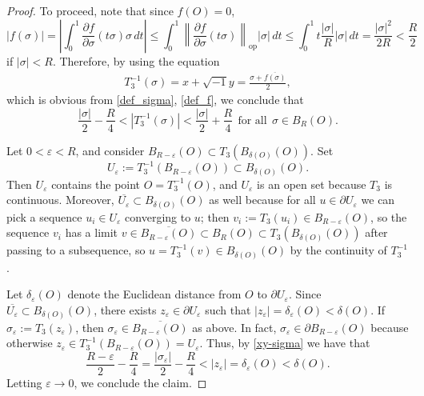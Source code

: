 \documentclass[11pt,reqno]{amsart}
\renewcommand{\leq}{\leqslant}
\theoremstyle{plain}
\theoremstyle{definition}
\numberwithin{equation}{section}
\begin{document}
\begin{proof}
\noindent To proceed, note that since $f(O)=0$,
$$
  |f(\sigma)| = \displaystyle \left|\int_{0}^{1} \frac{\partial f}{\partial \sigma}(t\sigma)\sigma \, dt\right|  
           \leq  \displaystyle \int_{0}^{1} \left\|\frac{\partial f}{\partial \sigma}(t\sigma)\right\|_{\operatorname{op}}|\sigma| \, dt 
           \leq  \displaystyle  \int_{0}^{1} t\frac{|\sigma|}{R}|\sigma| \, dt 
           =  \displaystyle  \frac{|\sigma|^2}{2R} 
           <   \displaystyle \frac{R}{2}
$$
if $|\sigma|<R$. Therefore, by using the equation
\begin{align*}
    T_3^{-1}(\sigma) = x+\sqrt{-1}y=\frac{\sigma+\overline{f(\sigma)}}{2},
\end{align*}
which is obvious from \eqref{def_sigma}, \eqref{def_f}, we conclude that
\begin{equation}\label{xy-sigma}
\frac{|\sigma|}{2}-\frac{R}{4} < |T_3^{-1}(\sigma)| < \frac{|\sigma|}{2}+\frac{R}{4} \;\,\text{for all}\;\,\sigma \in B_R(O).
\end{equation}

\noindent {\bf Proof of the inequality $R/4\leq\delta(O)$:} Let $0<\varepsilon<R$, and consider $B_{R-\varepsilon}(O)\subset T_{3}(B_{\delta(O)}(O))$. Set $$U_{\varepsilon}:=T_{3}^{-1}(B_{R-\varepsilon}(O))\subset B_{\delta(O)}(O).$$
Then $U_\varepsilon$ contains the point $O = T_3^{-1}(O)$, and $U_\varepsilon$ is an open set because $T_3$ is continuous. Moreover, $\overline{U_{\varepsilon}}\subset B_{\delta(O)}(O)$ as well because for all $u \in \partial U_\varepsilon$ we can pick a sequence $u_i \in U_\varepsilon$ converging to $u$; then $v_i := T_3(u_i) \in B_{R-\varepsilon}(O)$, so the sequence $v_i$ has a limit $v \in \overline{B_{R-\varepsilon}(O)} \subset B_R(O) \subset T_3(B_{\delta(O)}(O))$ after passing to a subsequence, so $u = T_3^{-1}(v) \in B_{\delta(O)}(O)$ by the continuity of $T_3^{-1}$.

Let $\delta_{\varepsilon}(O)$ denote the Euclidean distance from $O$ to $\partial U_{\varepsilon}$. Since $\overline{U_\varepsilon}\subset B_{\delta(O)}(O)$, there exists $z_\varepsilon\in\partial U_\varepsilon $ such that $|z_{\varepsilon}|=\delta_{\varepsilon}(O) < \delta(O)$. If  $\sigma_{\varepsilon}:=T_{3}(z_{\varepsilon})$, then $\sigma_\varepsilon\in \overline{B_{R-\varepsilon}(O)}$ as above. In fact, $\sigma_\varepsilon \in \partial B_{R-\varepsilon}(O)$ because otherwise $z_\varepsilon \in T_3^{-1}(B_{R-\varepsilon}(O)) = U_\varepsilon$. Thus, by \eqref{xy-sigma} we have that
$$\frac{R-\varepsilon}{2} - \frac{R}{4} = \frac{|\sigma_{\varepsilon}|}{2}-\frac{R}{4} < |z_{\varepsilon}| = \delta_\varepsilon(O) < \delta(O).$$
Letting $\varepsilon\to 0$, we conclude the claim.\medskip


\end{proof}
\end{document}
